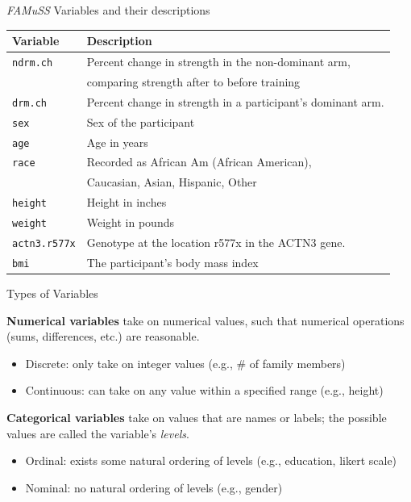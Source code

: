 \documentclass[10pt]{beamer}\usepackage[]{graphicx}\usepackage[]{color}
\begin{document}
\begin{frame}{\emph{FAMuSS} Variables and their descriptions}
	\protect\hypertarget{famuss-variables-and-their-descriptions}{}
	
	\begin{center}
		\begin{tabular}{ll}
			{\bf Variable} & {\bf Description} \\
\hline 
\texttt{ndrm.ch} & Percent change in strength in the non-dominant arm, \\
& comparing strength after to before training \\
\texttt{drm.ch} & Percent change in strength in a participant's dominant arm.\\
			\texttt{sex} & Sex of the participant \\
			\texttt{age} & Age in years   \\
			\texttt{race} & Recorded as African Am (African American),\\
			& Caucasian, Asian, Hispanic, Other \\
			\texttt{height} & Height in inches    \\
			\texttt{weight} & Weight in pounds  \\
			\texttt{actn3.r577x} & Genotype at the location r577x in the ACTN3 gene. \\
			\texttt{bmi} & The participant's body mass index 
		\end{tabular}
	\end{center}
	
\end{frame}

\begin{frame}{Types of Variables}
	\protect\hypertarget{types-of-variables}{}
	
	\textbf{Numerical variables} take on numerical values, such that
	numerical operations (sums, differences, etc.) are reasonable.
	
	\begin{itemize}
		\item
		Discrete: only take on integer values (e.g., \# of family members)
		\item
		Continuous: can take on any value within a specified range (e.g.,
		height)
	\end{itemize}
	
	\pause
	
	\textbf{Categorical variables} take on values that are names or labels;
	the possible values are called the variable's \emph{levels}.
	
	\begin{itemize}
		\tightlist
		\item
		Ordinal: exists some natural ordering of levels (e.g., education, likert scale)
		\item
		Nominal: no natural ordering of levels (e.g., gender)
	\end{itemize}
	
\end{frame}
\end{document}
